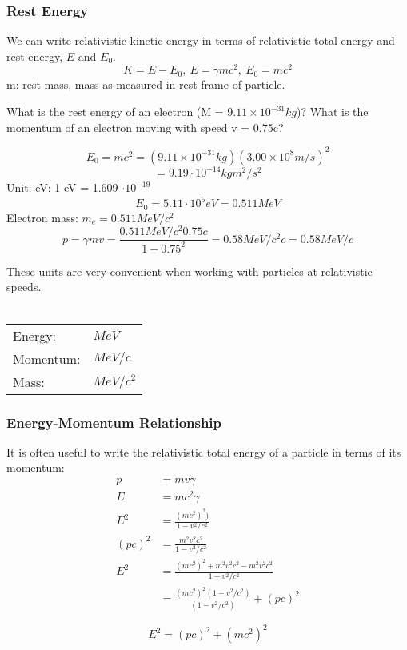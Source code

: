 \documentclass[class=article,crop=false]{standalone}
\begin{document}
\subsubsection{Rest Energy}
We can write relativistic kinetic energy in terms of relativistic total energy and rest energy, $E$ and $E_0$.
$$ K = E - E_0,\  E = \gamma mc^2,\ E_0 = mc^2 $$
m: rest mass, mass as measured in rest frame of particle.

\begin{question}
	What is the rest energy of an electron (M = $9.11 \times 10^{-31} kg$)? What is the momentum of an electron moving with speed v = 0.75c?
	\begin{answer}[Answer]
		$$E_0 = mc^2 = (9.11 \times 10^{-31} kg) (3.00 \times 10^8 m/s)^2 $$
		$$ = 9.19 \cdot 10^{-14} kg m^2/s^2$$
		Unit: eV: 1 eV = 1.609 $\cdot 10^{-19}$
		$$E_0 = 5.11 \cdot 10^5 eV = 0.511 MeV$$
		Electron mass: $m_e = 0.511 MeV/c^2$
		\bigskip
		$$ p = \gamma mv = \frac{0.511 MeV/c^2 0.75 c}{1 - 0.75^2} = 0.58 MeV/c^2 c = 0.58 MeV/c $$
	\end{answer}
\end{question}

\begin{result}[Units:]
	These units are very convenient when working with particles at relativistic speeds. \\\\
		\begin{tabular}{l|l}
			Energy: & $MeV$ \\
			Momentum: & $MeV/c$ \\
			Mass: & $MeV/c^2$
		\end{tabular}
\end{result}

\newpage
\subsubsection{Energy-Momentum Relationship}
It is often useful to write the relativistic total energy of a particle in terms of its momentum:\\
\begin{align*}
	p &= mv \gamma \\
	E &= mc^2 \gamma \\
	E^2 &= \frac{(mc^2)^2)}{1-v^2/c^2}  \\
	(pc)^2 &= \frac{m^2v^2c^2}{1-v^2/c^2} \\
	E^2 &= \frac{(mc^2)^2 + m^2v^2c^2 - m^2v^2c^2}{1-v^2/c^2} \\
	&= \frac{(mc^2)^2(1-v^2/c^2)}{(1-v^2/c^2)} + (pc)^2
\end{align*}
\begin{result}
	$$ E^2 = (pc)^2 + (mc^2)^2 $$
\end{result}
\end{document}
